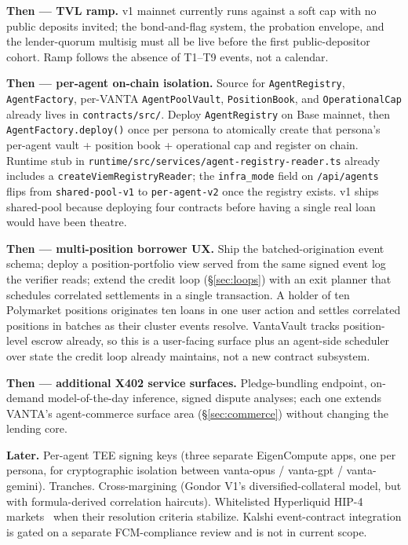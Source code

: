 \documentclass[11pt,letterpaper]{article}
\begin{document}
\textbf{Then --- TVL ramp.} v1 mainnet currently runs against a soft cap with no public deposits invited; the bond-and-flag system, the probation envelope, and the lender-quorum multisig must all be live before the first public-depositor cohort. Ramp follows the absence of T1--T9 events, not a calendar.

\textbf{Then --- per-agent on-chain isolation.} Source for \texttt{AgentRegistry}, \texttt{AgentFactory}, per-VANTA \texttt{AgentPoolVault}, \texttt{PositionBook}, and \texttt{OperationalCap} already lives in \texttt{contracts/src/}. Deploy \texttt{AgentRegistry} on Base mainnet, then \texttt{AgentFactory.deploy()} once per persona to atomically create that persona's per-agent vault + position book + operational cap and register on chain. Runtime stub in \texttt{runtime/src/services/agent-registry-reader.ts} already includes a \texttt{createViemRegistryReader}; the \texttt{infra\_mode} field on \texttt{/api/agents} flips from \texttt{shared-pool-v1} to \texttt{per-agent-v2} once the registry exists. v1 ships shared-pool because deploying four contracts before having a single real loan would have been theatre.

\textbf{Then --- multi-position borrower UX.} Ship the batched-origination event schema; deploy a position-portfolio view served from the same signed event log the verifier reads; extend the credit loop (\S\ref{sec:loops}) with an exit planner that schedules correlated settlements in a single transaction. A holder of ten Polymarket positions originates ten loans in one user action and settles correlated positions in batches as their cluster events resolve. VantaVault tracks position-level escrow already, so this is a user-facing surface plus an agent-side scheduler over state the credit loop already maintains, not a new contract subsystem.

\textbf{Then --- additional X402 service surfaces.} Pledge-bundling endpoint, on-demand model-of-the-day inference, signed dispute analyses; each one extends VANTA's agent-commerce surface area (\S\ref{sec:commerce}) without changing the lending core.

\textbf{Later.} Per-agent TEE signing keys (three separate EigenCompute apps, one per persona, for cryptographic isolation between vanta-opus / vanta-gpt / vanta-gemini). Tranches. Cross-margining (Gondor V1's diversified-collateral model, but with formula-derived correlation haircuts). Whitelisted Hyperliquid HIP-4 markets~\cite{hyperliquid-hip4} when their resolution criteria stabilize. Kalshi event-contract integration is gated on a separate FCM-compliance review and is not in current scope.
\end{document}
